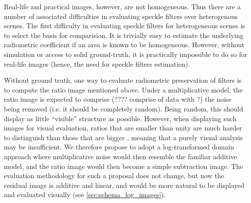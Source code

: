 \documentclass[journal]{IEEEtran}
\begin{document}
Real-life and practical images, however, are not homogeneous.
Thus there are a number of associated difficulties in evaluating speckle filters over heterogenous scenes.
The first difficulty in evaluating speckle filters for heterogeneous scenes is to select the basis for comparision. 
It is trivially easy to estimate the underlying radiometric coefficient if an area is known to be homogeneous.
However, without simulation or access to solid ground-truth, it is practically impossible to do so for 
	real-life images (hence, the need for speckle filters estimation).

Without ground truth, one way to evaluate radiometric preservation of filters is to compute the ratio image 
	mentioned above. 
Under a multiplicative model, the ratio image is expected to comprise (???? comprise of data with ?)
	the noise being removed (i.e. it should be completely random). 
Being random, this should display as little ``visible'' structure as possible. 
However, when displaying such images for visual evaluation, ratios that are smaller than unity are much 
harder to distinguish than those that are bigger \cite{Medeiros_2003_IJRS}, 
meaning that a purely visual analysis may be insufficient.
We therefore propose to adopt a log-transformed domain approach where multiplicative noise 
would then resemble the familiar additive model, and the ratio image would then become a simple subtraction image.
The evaluation methodology for such a proposal does not change, 
	but now the residual image is additive and linear, 
	and would be more natural to be displayed and evaluated visually (see \ref{sec:schema_log_images}).
\end{document}
